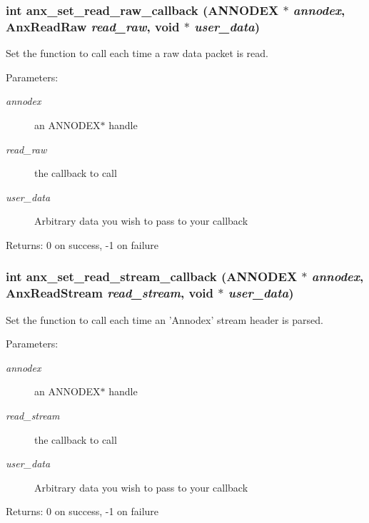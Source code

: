 \subsubsection{\setlength{\rightskip}{0pt plus 5cm}int anx\_\-set\_\-read\_\-raw\_\-callback ({\bf ANNODEX} $\ast$ {\em annodex}, {\bf Anx\-Read\-Raw} {\em read\_\-raw}, void $\ast$ {\em user\_\-data})}\label{anx__read_8h_a13}


Set the function to call each time a raw data packet is read. 

\begin{Desc}
\item[Parameters:]
\begin{description}
\item[{\em annodex}]an ANNODEX$\ast$ handle \item[{\em read\_\-raw}]the callback to call \item[{\em user\_\-data}]Arbitrary data you wish to pass to your callback \end{description}
\end{Desc}
\begin{Desc}
\item[Returns:]0 on success, -1 on failure \end{Desc}
\subsubsection{\setlength{\rightskip}{0pt plus 5cm}int anx\_\-set\_\-read\_\-stream\_\-callback ({\bf ANNODEX} $\ast$ {\em annodex}, {\bf Anx\-Read\-Stream} {\em read\_\-stream}, void $\ast$ {\em user\_\-data})}\label{anx__read_8h_a5}


Set the function to call each time an 'Annodex' stream header is parsed. 

\begin{Desc}
\item[Parameters:]
\begin{description}
\item[{\em annodex}]an ANNODEX$\ast$ handle \item[{\em read\_\-stream}]the callback to call \item[{\em user\_\-data}]Arbitrary data you wish to pass to your callback \end{description}
\end{Desc}
\begin{Desc}
\item[Returns:]0 on success, -1 on failure \end{Desc}
